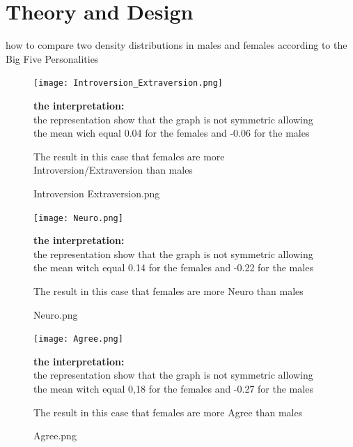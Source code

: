 
\section{Theory and Design}
how to compare two density distributions in males and females according to the Big Five Personalities

\begin{figure}[]
\setlength{\abovecaptionskip}{-4pt}
\begin{center}
\texttt{[image: Introversion\_Extraversion.png]}
  \caption{Introversion Extraversion.png}
  \end{center}


{\normalsize{\bf the interpretation:}} \\\vspace{0.5cm}
the representation show that the graph is not symmetric allowing 
the mean wich equal 0.04  for the females and -0.06  for the males 

The result in this case that females are more Introversion/Extraversion than males
\end{figure}


\begin{figure}[]
\setlength{\abovecaptionskip}{-4pt}
\begin{center}
\texttt{[image: Neuro.png]}
  \caption{Neuro.png}
  \end{center}

{\normalsize{\bf the interpretation:}} \\\vspace{0.5cm}
the representation show that the graph is not symmetric allowing 
the mean witch equal 0.14 for the females and -0.22 for the males 

The result in this case that females are more Neuro  than males
\end{figure}

\begin{figure}[]
\setlength{\abovecaptionskip}{-4pt}
\begin{center}
\texttt{[image: Agree.png]}
  \caption{Agree.png}
  \end{center}

{\normalsize{\bf the interpretation:}} \\\vspace{0.5cm}
the representation show that the graph is not symmetric allowing 
the mean witch equal 0,18 for the females and -0.27 for the males

The result in this case that females are more Agree  than males
\end{figure}

